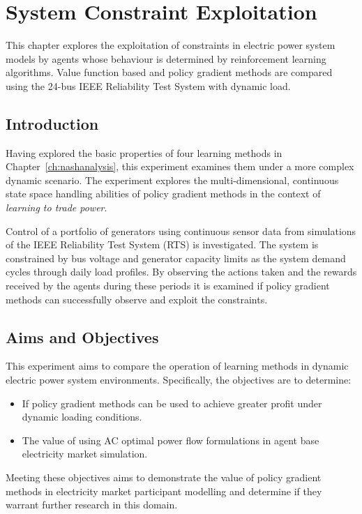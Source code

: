 \chapter{System Constraint Exploitation}
\label{ch:exploitation}
This chapter explores the exploitation of constraints in electric power
system models by agents whose behaviour is determined by reinforcement learning
algorithms.  Value function based and policy gradient methods are compared
using the 24-bus IEEE Reliability Test System with dynamic load.

\section{Introduction}
Having explored the basic properties of four learning methods in
Chapter~\ref{ch:nashanalysis}, this experiment examines them under a
more complex dynamic scenario.  The experiment explores the multi-dimensional,
continuous state space handling abilities of policy gradient methods in the
context of \textit{learning to trade power}.

Control of a portfolio of generators using continuous sensor data from
simulations of the IEEE Reliability Test System (RTS) \cite{ieee79rts} is
investigated.  The system is constrained by bus voltage and generator capacity
limits as the system demand cycles through daily load profiles. By
observing the actions taken and the rewards received by the agents during these
periods it is examined if policy gradient methods can successfully observe and
exploit the constraints.

\section{Aims and Objectives}
This experiment aims to compare the operation of learning methods in dynamic
electric power system environments.  Specifically, the objectives are to
determine:
\begin{itemize}
  \item If policy gradient methods can be used to achieve greater profit under
  dynamic loading conditions.
  \item The value of using AC optimal power flow formulations in agent base
  electricity market simulation.
\end{itemize}
Meeting these objectives aims to demonstrate the value of policy gradient
methods in electricity market participant modelling and determine if they
warrant further research in this domain.

